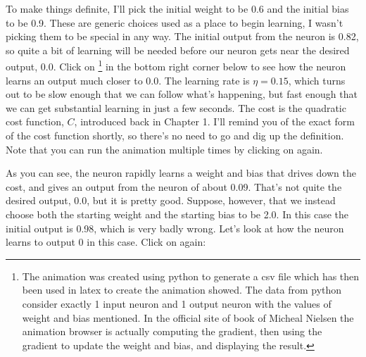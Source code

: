 \documentclass[a4paper,11pt,twoside]{report}
\begin{document}
To make things definite, I'll pick the initial weight to be 0.6 and the initial bias to be 0.9. These are generic choices used as a place to begin learning, I wasn't picking them to be special in any way. The initial output from the neuron is 0.82, so quite a bit of learning will be needed before our neuron gets near the desired output, 0.0. Click on \footnote{The animation was created using python to generate a csv file which has then been used in latex to create the animation showed. The data from python consider exactly 1 input neuron and 1 output neuron with the values of weight and bias mentioned. In the official site of   book of Micheal Nielsen the animation  browser is actually computing the gradient, then using the gradient to update the weight and bias, and displaying the result.} in the bottom right corner below to see how the neuron learns an output much closer to 0.0. The learning rate is $\eta=0.15$, which turns out to be slow enough that we can follow what's happening, but fast enough that we can get substantial learning in just a few seconds. The cost is the quadratic cost function, $C$, introduced back in Chapter 1. I'll remind you of the exact form of the cost function shortly, so there's no need to go and dig up the definition. Note that you can run the animation multiple times by clicking on  again.

As you can see, the neuron rapidly learns a weight and bias that drives down the cost, and gives an output from the neuron of about 0.09. That's not quite the desired output, 0.0, but it is pretty good. Suppose, however, that we instead choose both the starting weight and the starting bias to be 2.0. In this case the initial output is 0.98, which is very badly wrong. Let's look at how the neuron learns to output 0 in this case. Click on  again:

\end{document}
